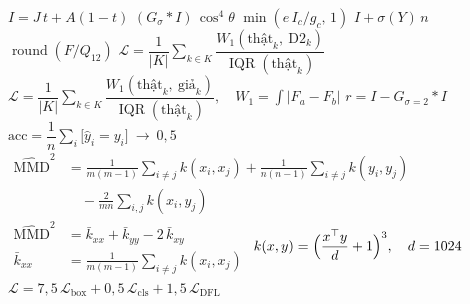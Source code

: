 \documentclass[border=1.5pt,multi=eqn]{standalone}
\newenvironment{eqn}[1]{\fontsize{18}{22}\selectfont\color[HTML]{#1}$\displaystyle}{$}
\begin{document}
\begin{eqn}{0E2238}I=J\,t+A(1-t)\end{eqn}
\begin{eqn}{0E2238}(G_\sigma\ast I)\,\cos^{4}\theta\end{eqn}
\begin{eqn}{0E2238}\min(e\,I_c/g_c,\,1)\end{eqn}
\begin{eqn}{0E2238}I+\sigma(Y)\,n\end{eqn}
\begin{eqn}{0E2238}\operatorname{round}(F/Q_{12})\end{eqn}
\begin{eqn}{FFFFFF}\mathcal{L}=\dfrac{1}{|K|}\sum_{k\in K}\dfrac{W_1(\text{thật}_k,\ \text{D2}_k)}{\operatorname{IQR}(\text{thật}_k)}\end{eqn}
\begin{eqn}{0E2238}\mathcal{L}=\dfrac{1}{|K|}\sum_{k\in K}\dfrac{W_1(\text{thật}_k,\ \text{giả}_k)}{\operatorname{IQR}(\text{thật}_k)},\quad W_1=\int\bigl|F_a-F_b\bigr|\end{eqn}
\begin{eqn}{0E2238}r=I-G_{\sigma=2}\ast I\end{eqn}
\begin{eqn}{0E2238}\mathrm{acc}=\dfrac{1}{n}\sum_{i}\bigl[\hat y_i=y_i\bigr]\ \to\ 0{,}5\end{eqn}
\begin{eqn}{0E2238}\begin{aligned}\widehat{\mathrm{MMD}}^{2}&=\tfrac{1}{m(m-1)}\sum_{i\neq j}k(x_i,x_j)+\tfrac{1}{n(n-1)}\sum_{i\neq j}k(y_i,y_j)\\&\quad-\tfrac{2}{mn}\sum_{i,j}k(x_i,y_j)\end{aligned}\end{eqn}
\begin{eqn}{0E2238}\begin{aligned}\widehat{\mathrm{MMD}}^{2}&=\bar{k}_{xx}+\bar{k}_{yy}-2\,\bar{k}_{xy}\\ \bar{k}_{xx}&=\tfrac{1}{m(m-1)}\textstyle\sum_{i\neq j}k(x_i,x_j)\end{aligned}\end{eqn}
\begin{eqn}{0E2238}k(x,y)=\Bigl(\dfrac{x^{\top}y}{d}+1\Bigr)^{3},\quad d=1024\end{eqn}
\begin{eqn}{0E2238}\mathcal{L}=7{,}5\,\mathcal{L}_{\text{box}}+0{,}5\,\mathcal{L}_{\text{cls}}+1{,}5\,\mathcal{L}_{\text{DFL}}\end{eqn}
\end{document}
